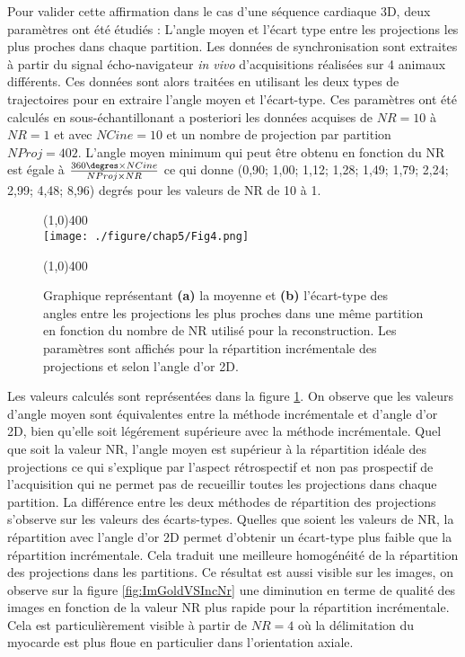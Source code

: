 Pour valider cette affirmation dans le cas d'une séquence cardiaque 3D, deux paramètres ont été étudiés : L'angle moyen et l'écart type entre les projections les plus proches dans chaque partition. Les données de synchronisation sont extraites à partir du signal écho-navigateur \textit{in vivo} d'acquisitions réalisées sur 4 animaux différents. Ces données sont alors traitées en utilisant les deux types de trajectoires pour en extraire l'angle moyen et l'écart-type. Ces paramètres ont été calculés en sous-échantillonant a posteriori les données acquises de $NR = 10$ à $NR = 1$ et avec $NCine = 10$ et un nombre de projection par partition $NProj = 402$.
L'angle moyen minimum qui peut être obtenu en fonction du NR est égale à $\frac{360\degres \times NCine}{NProj \times NR}$ ce qui donne  (0,90; 1,00; 1,12; 1,28; 1,49; 1,79; 2,24; 2,99; 4,48; 8,96) degrés pour les valeurs de NR de 10 à 1.

\begin{figure}[H]
\centering
\line(1,0){400} \\
\texttt{[image: ./figure/chap5/Fig4.png]}
\caption[Influence de la trajectoire en fonction du sous-échantillonnage]{\label{fig:GoldVSIncNr} Graphique représentant \textbf{(a)} la moyenne et \textbf{(b)} l'écart-type des angles entre les projections les plus proches dans une même partition en fonction du nombre de NR utilisé pour la reconstruction. Les paramètres sont affichés pour la répartition incrémentale des projections et selon l'angle d'or 2D.}
\line(1,0){400} \\ 
\end{figure}

Les valeurs calculés sont représentées dans la figure \ref{fig:GoldVSIncNr}. On observe que les valeurs d'angle moyen sont équivalentes entre la méthode incrémentale et d'angle d'or 2D, bien qu'elle soit légérement supérieure avec la méthode incrémentale. Quel que soit la valeur NR, l'angle moyen est supérieur à la répartition idéale des projections ce qui s'explique par l'aspect rétrospectif et non pas prospectif de l'acquisition qui ne permet pas de recueillir toutes les projections dans chaque partition. 
La différence entre les deux méthodes de répartition des projections s'observe sur les valeurs des écarts-types. Quelles que soient les valeurs de NR, la répartition avec l'angle d'or 2D permet d'obtenir un écart-type plus faible que la répartition incrémentale. Cela traduit une meilleure homogénéité de la répartition des projections dans les partitions.
Ce résultat est aussi visible sur les images, on observe sur la figure \ref{fig:ImGoldVSIncNr} une diminution en terme de qualité des images en fonction de la valeur NR plus rapide pour la répartition incrémentale. Cela est particulièrement visible à partir de $NR = 4$ où la délimitation du myocarde est plus floue en particulier dans l'orientation axiale.
 
